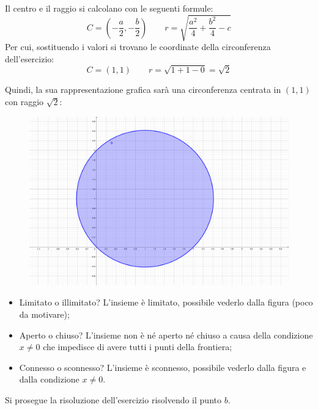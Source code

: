 \documentclass[a4paper]{article}
\begin{document}
	Il centro e il raggio si calcolano con le seguenti formule:
	\begin{equation*}
		C = \left(-\dfrac{a}{2}, -\dfrac{b}{2}\right)
		\hspace{2em}
		r = \sqrt{\dfrac{a^{2}}{4} + \dfrac{b^{2}}{4} - c}
	\end{equation*}
	Per cui, sostituendo i valori si trovano le coordinate della circonferenza dell'esercizio:
	\begin{equation*}
		C = \left(1, 1\right)
		\hspace{2em}
		r = \sqrt{1 + 1 - 0} = \sqrt{2}
	\end{equation*}\newpage

	\noindent
	Quindi, la sua rappresentazione grafica sarà una circonferenza centrata in $\left(1,1\right)$ con raggio $\sqrt{2}$:
	\begin{figure}[!htp]
		\centering
		\includegraphics[width=\textwidth]{img/grafico-ex3-esame1.pdf}
	\end{figure}
	\begin{itemize}
		\item Limitato o illimitato? L'insieme è limitato, possibile vederlo dalla figura (poco da motivare);
		
		\item Aperto o chiuso? L'insieme non è né aperto né chiuso a causa della condizione $x \ne 0$ che impedisce di avere tutti i punti della frontiera;
		
		\item Connesso o sconnesso? L'insieme è sconnesso, possibile vederlo dalla figura e dalla condizione $x \ne 0$.
	\end{itemize}
	Si prosegue la risoluzione dell'esercizio risolvendo il punto $b$.
	
\end{document}
